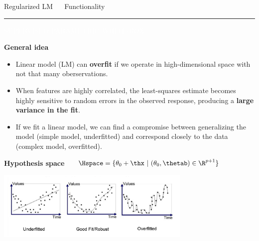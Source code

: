 \documentclass[11pt,compress,t,notes=noshow, xcolor=table]{beamer}
\begin{document}
\LARGE
\begin{frame}{\textcolor{gray!80}{Regularized LM} ~~ Functionality}
\normalsize
\vspace{-0.5cm}
\noindent \textcolor{gray!80}{\rule{\textwidth}{1pt}}

\vspace{0.3cm}

\footnotesize

\colorbox{gray!80}{\textcolor{white}{SUPERVISED}}
\colorbox{gray!80}{\textcolor{white}{PARAMETRIC}}
\colorbox{gray!80}{\textcolor{white}{WHITE-BOX}}

\medskip

\textbf{\textcolor{gray!80}{General idea}} ~~
\begin{itemize}

\item Linear model (LM) can \textbf{overfit} if we operate in high-dimensional space with not that many oberservations.

\item When features are highly correlated, the least-squares estimate becomes highly sensitive to random errors in the observed response, producing a \textbf{large variance in the fit}.

\item If we fit a linear model, we can find a compromise between generalizing the model (simple model, underfitted) and correspond closely to the data (complex model, overfitted).

\end{itemize}

\medskip

\textbf{\textcolor{gray!80}{Hypothesis space}} ~~
$\Hspace = \{ \theta_0 + \thx\ |\ (\theta_0, \thetab) \in \R^{p+1} \} $

\medskip
\centering
  \includegraphics[width=0.7\textwidth]{figure/reg_lm_comparision.png}

\end{frame}
\end{document}
